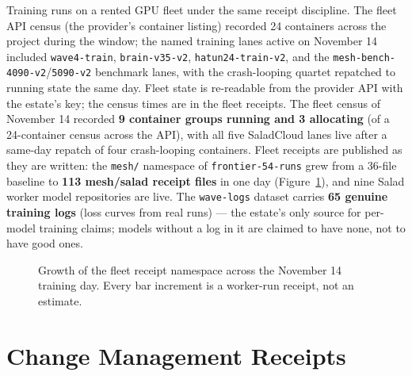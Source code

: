 Training runs on a rented GPU fleet under the same receipt discipline. The fleet API census (the provider's container listing) recorded 24 containers across the project during the window; the named training lanes active on November 14 included \texttt{wave4-train}, \texttt{brain-v35-v2}, \texttt{hatun24-train-v2}, and the \texttt{mesh-bench-4090-v2}/\texttt{5090-v2} benchmark lanes, with the crash-looping quartet repatched to running state the same day. Fleet state is re-readable from the provider API with the estate's key; the census times are in the fleet receipts. The fleet census of November 14 recorded \textbf{9 container groups running and 3 allocating} (of a 24-container census across the API), with all five SaladCloud lanes live after a same-day repatch of four crash-looping containers. Fleet receipts are published as they are written: the \texttt{mesh/} namespace of \texttt{frontier-54-runs} grew from a 36-file baseline to \textbf{113 mesh/salad receipt files} in one day (Figure~\ref{fig:fleetreceipts}), and nine Salad worker model repositories are live. The \texttt{wave-logs} dataset carries \textbf{65 genuine training logs} (loss curves from real runs) --- the estate's only source for per-model training claims; models without a log in it are claimed to have none, not to have good ones.

\begin{figure}[htbp]
\centering
{}
\caption{Growth of the fleet receipt namespace across the November 14 training day. Every bar increment is a worker-run receipt, not an estimate.}
\label{fig:fleetreceipts}
\end{figure}

\section{Change Management Receipts}
\label{sec:change}

